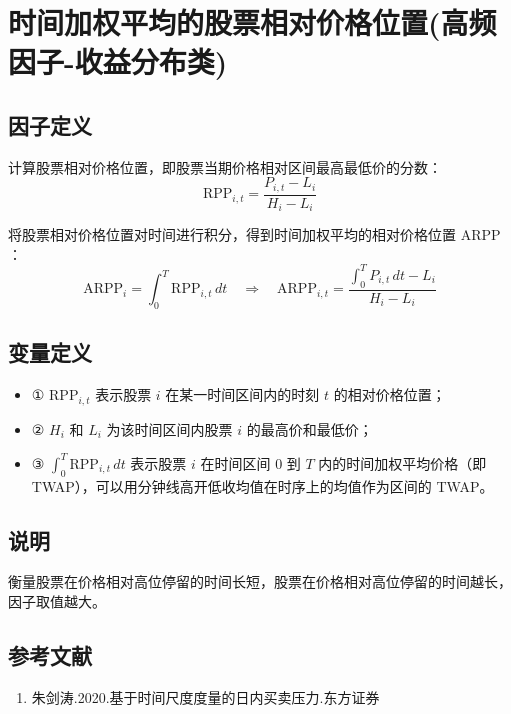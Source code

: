 \documentclass{article}
\begin{document}
\section{时间加权平均的股票相对价格位置(高频因子-收益分布类)}

\subsection{因子定义}
计算股票相对价格位置，即股票当期价格相对区间最高最低价的分数：
\begin{equation}
    \mathrm{RPP}_{i,t} = \frac{P_{i,t} - L_i}{H_i - L_i}
\end{equation}

将股票相对价格位置对时间进行积分，得到时间加权平均的相对价格位置 \( \mathrm{ARPP} \)：
\begin{equation}
    \mathrm{ARPP}_i = \int_0^T \mathrm{RPP}_{i,t} \, dt \quad \Rightarrow \quad \mathrm{ARPP}_{i,t} = \frac{\int_0^T P_{i,t} \, dt - L_i}{H_i - L_i}
\end{equation}

\subsection{变量定义}
\begin{itemize}
    \item ① \( \mathrm{RPP}_{i,t} \) 表示股票 \( i \) 在某一时间区间内的时刻 \( t \) 的相对价格位置；
    \item ② \( H_i \) 和 \( L_i \) 为该时间区间内股票 \( i \) 的最高价和最低价；
    \item ③ \( \displaystyle \int_0^T \mathrm{RPP}_{i,t} \, dt \) 表示股票 \( i \) 在时间区间 \( 0 \) 到 \( T \) 内的时间加权平均价格（即 TWAP），可以用分钟线高开低收均值在时序上的均值作为区间的 TWAP。
\end{itemize}

\subsection{说明}
衡量股票在价格相对高位停留的时间长短，股票在价格相对高位停留的时间越长，因子取值越大。

\subsection{参考文献}
\begin{enumerate}
    \item 朱剑涛.2020.基于时间尺度度量的日内买卖压力.东方证券
\end{enumerate}
\end{document}
